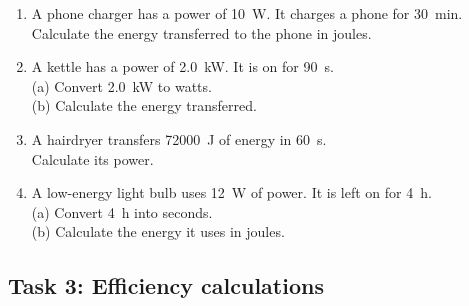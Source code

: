 \documentclass[11pt,a4paper]{article}
\begin{document}
\begin{enumerate}[label=\arabic*)]
    \item A phone charger has a power of \SI{10}{\watt}. It charges a phone for \SI{30}{\minute}. \\
    Calculate the energy transferred to the phone in joules.
    \vspace{2cm}

    \item A kettle has a power of \SI{2.0}{\kilo\watt}. It is on for \SI{90}{\second}. \\
    (a) Convert \SI{2.0}{\kilo\watt} to watts. \\
    (b) Calculate the energy transferred.
    \vspace{3cm}

    \item A hairdryer transfers \SI{72 000}{\joule} of energy in \SI{60}{\second}. \\
    Calculate its power.
    \vspace{2.5cm}

    \item A low-energy light bulb uses \SI{12}{\watt} of power. It is left on for \SI{4}{\hour}. \\
    (a) Convert \SI{4}{\hour} into seconds. \\
    (b) Calculate the energy it uses in joules.
    \vspace{3cm}
\end{enumerate}
\newpage
\subsection*{Task 3: Efficiency calculations}
\end{document}
